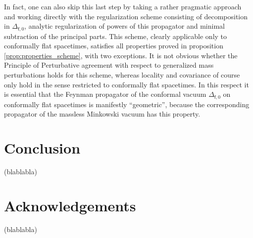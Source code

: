\documentclass[11pt]{book}
\newcommand{\fsf}{\mathsf{f}}
\theoremstyle{break}
\begin{document}
In fact, one can also skip this last step by taking a rather pragmatic approach and working directly with the regularization scheme consisting of decomposition in $\Delta_{\fsf,0}$, analytic regularization of powers of this propagator and minimal subtraction of the principal parts. This scheme, clearly applicable only to conformally flat spacetimes, satisfies all properties proved in proposition \ref{prop:properties_scheme}, with two exceptions. It is not obvious whether the Principle of Perturbative agreement with respect to generalized mass perturbations holds for this scheme, whereas locality and covariance of course only hold in the sense restricted to conformally flat spacetimes. In this respect it is essential that the Feynman propagator of the conformal vacuum $\Delta_{\fsf,0}$ on conformally flat spacetimes is manifestly ``geometric'', because the corresponding propagator of the massless Minkowski vacuum has this property.



\chapter*{Conclusion}


(blablabla)


\newpage
\vspace*{100pt}
\thispagestyle{empty}
\chapter*{Acknowledgements}


(blablabla)






\nocite{*}








\end{document}
